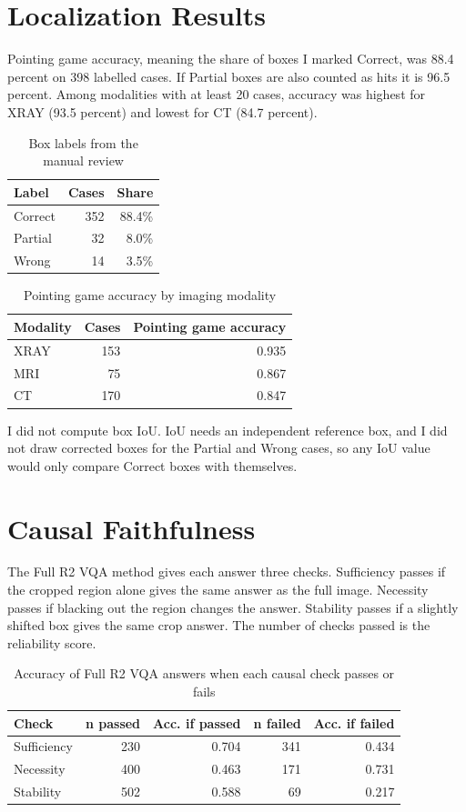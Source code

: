 \documentclass[11pt]{article}
\begin{document}
\section{Localization Results}
Pointing game accuracy, meaning the share of boxes I marked Correct, was 88.4 percent on 398 labelled cases. If Partial boxes are also counted as hits it is 96.5 percent. Among modalities with at least 20 cases, accuracy was highest for XRAY (93.5 percent) and lowest for CT (84.7 percent).

\begin{table}[h]
\centering
\caption{Box labels from the manual review}
\begin{tabular}{lrr}
\toprule
Label & Cases & Share \\
\midrule
Correct & 352 & 88.4\% \\
Partial & 32 & 8.0\% \\
Wrong & 14 & 3.5\% \\
\bottomrule
\end{tabular}
\end{table}

\begin{table}[h]
\centering
\caption{Pointing game accuracy by imaging modality}
\begin{tabular}{lrr}
\toprule
Modality & Cases & Pointing game accuracy \\
\midrule
XRAY & 153 & 0.935 \\
MRI & 75 & 0.867 \\
CT & 170 & 0.847 \\
\bottomrule
\end{tabular}
\end{table}

I did not compute box IoU. IoU needs an independent reference box, and I did not draw corrected boxes for the Partial and Wrong cases,
so any IoU value would only compare Correct boxes with themselves.

\section{Causal Faithfulness}
The Full R2 VQA method gives each answer three checks. Sufficiency passes if the cropped region alone gives the same answer as the full image. Necessity passes if blacking out the region changes the answer. Stability passes if a slightly shifted box gives the same crop answer. The number of checks passed is the reliability score.

\begin{table}[h]
\centering
\caption{Accuracy of Full R2 VQA answers when each causal check passes or fails}
\begin{tabular}{lrrrr}
\toprule
Check & n passed & Acc. if passed & n failed & Acc. if failed \\
\midrule
Sufficiency & 230 & 0.704 & 341 & 0.434 \\
Necessity & 400 & 0.463 & 171 & 0.731 \\
Stability & 502 & 0.588 & 69 & 0.217 \\
\bottomrule
\end{tabular}
\end{table}
\end{document}
